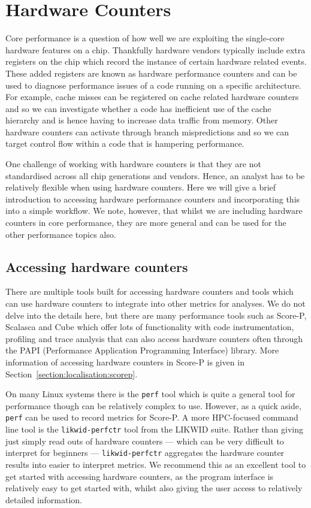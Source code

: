 \section{Hardware Counters} \label{section:core:hardware-counters}

Core performance is a question of how well we are exploiting the single-core
hardware features on a chip. Thankfully hardware vendors typically include
extra registers on the chip which record the instance of certain hardware
related events. These added registers are known as hardware performance
counters and can be used to diagnose performance issues of a code running on a
specific architecture. For example, cache misses can be registered on cache
related hardware counters and so we can investigate whether a code has
inefficient use of the cache hierarchy and is hence having to increase data
traffic from memory. Other hardware counters can activate through branch
mispredictions and so we can target control flow within a code that is
hampering performance.

One challenge of working with hardware counters is that they are not
standardised across all chip generations and vendors. Hence, an analyst has to
be relatively flexible when using hardware counters. Here we will give a brief
introduction to accessing hardware performance counters and incorporating this
into a simple workflow. We note, however, that whilst we are including hardware
counters in core performance, they are more general and can be used for the
other performance topics also.

\subsection{Accessing hardware counters}

There are multiple tools built for accessing hardware counters and tools which
can use hardware counters to integrate into other metrics for analyses.  We do
not delve into the details here, but there are many performance tools such as
Score-P, Scalasca and Cube which offer lots of functionality with code
instrumentation, profiling and trace analysis that can also access hardware
counters often through the PAPI (Performance Application Programming Interface)
library. More information of accessing hardware counters in Score-P is given in
Section~\ref{section:localisation:scorep}.

On many Linux systems there is the \texttt{perf} tool which is quite a general
tool for performance though can be relatively complex to use. However, as a
quick aside, \texttt{perf} can be used to record metrics for Score-P. A more
HPC-focused command line tool is the \texttt{likwid-perfctr} tool from the
LIKWID suite. Rather than giving just simply read outs of hardware counters ---
which can be very difficult to interpret for beginners ---
\texttt{likwid-perfctr} aggregates the hardware counter results into easier to
interpret metrics. We recommend this as an excellent tool to get started with
accessing hardware counters, as the program interface is relatively easy to get
started with, whilst also giving the user access to relatively detailed
information.

